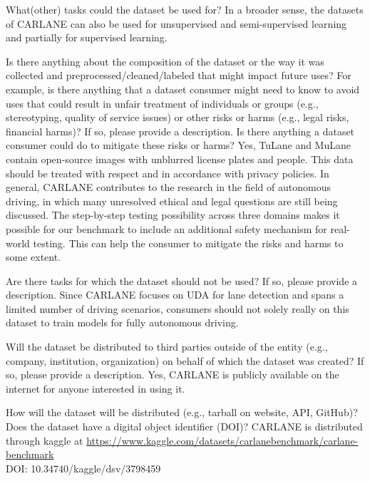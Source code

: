 \documentclass{article}
\begin{document}
	\begin{datasheetitem}{What(other) tasks could the dataset be used for?}
		In a broader sense, the datasets of CARLANE can also be used for unsupervised and semi-supervised learning and partially for supervised learning.
	\end{datasheetitem}
	\begin{datasheetitem}{Is there anything about the composition of the dataset or the way it was collected and preprocessed/cleaned/labeled that might impact future uses? \normalfont For example, is there anything that a dataset consumer might need to know to avoid uses that could result in unfair treatment of individuals or groups (e.g., stereotyping, quality of service issues) or other risks or harms (e.g., legal risks, financial harms)? If so, please provide a description. Is there anything a dataset consumer could do to mitigate these risks or harms?}
		Yes, TuLane and MuLane contain open-source images with unblurred license plates and people. This data should be treated with respect and in accordance with privacy policies. In general, CARLANE contributes to the research in the field of autonomous driving, in which many unresolved ethical and legal questions are still being discussed. The step-by-step testing possibility across three domains makes it possible for our benchmark to include an additional safety mechanism for real-world testing. This can help the consumer to mitigate the risks and harms to some extent.
	\end{datasheetitem}
	\begin{datasheetitem}{Are there tasks for which the dataset should not be used? \normalfont If so, please provide a description.}
		Since CARLANE focuses on UDA for lane detection and spans a limited number of driving scenarios, consumers should not solely really on this dataset to train models for fully autonomous driving. 
	\end{datasheetitem}
	\begin{datasheetitem}{Will the dataset be distributed to third parties outside of the entity (e.g., company, institution, organization) on behalf of which the dataset was created? \normalfont If so, please provide a description.}
		Yes, CARLANE is publicly available on the internet for anyone interested in using it.
	\end{datasheetitem}
	\begin{datasheetitem}{How will the dataset will be distributed (e.g., tarball on website, API, GitHub)? \normalfont Does the dataset have a digital object identifier (DOI)?}
		CARLANE is distributed through kaggle at \url{https://www.kaggle.com/datasets/carlanebenchmark/carlane-benchmark}\\ 
		
		DOI: 10.34740/kaggle/dsv/3798459
	\end{datasheetitem}
\end{document}
